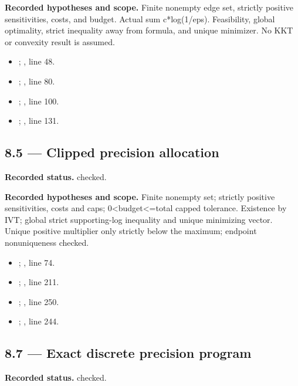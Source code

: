 \textbf{Recorded hypotheses and scope.} Finite nonempty edge set, strictly positive sensitivities, costs, and budget. Actual sum c*log(1/eps). Feasibility, global optimality, strict inequality away from formula, and unique minimizer. No KKT or convexity result is assumed.

\begin{itemize}
\item {}; , line 48.
\item {}; , line 80.
\item {}; , line 100.
\item {}; , line 131.
\end{itemize}
\subsection{8.5 — Clipped precision allocation}
\label{result:8.5}
\textbf{Recorded status.} checked.

\textbf{Recorded hypotheses and scope.} Finite nonempty set; strictly positive sensitivities, costs and caps; 0<budget<=total capped tolerance. Existence by IVT; global strict supporting-log inequality and unique minimizing vector. Unique positive multiplier only strictly below the maximum; endpoint nonuniqueness checked.

\begin{itemize}
\item {}; , line 74.
\item {}; , line 211.
\item {}; , line 250.
\item {}; , line 244.
\end{itemize}
\subsection{8.7 — Exact discrete precision program}
\label{result:8.7}
\textbf{Recorded status.} checked.

